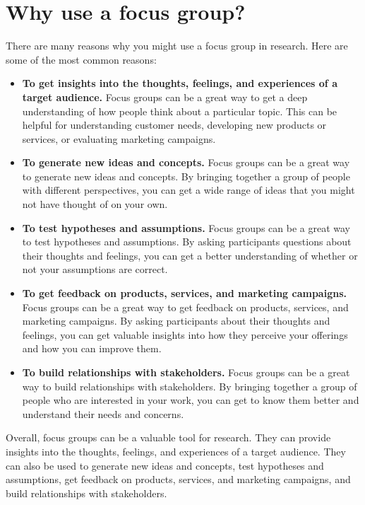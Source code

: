 \documentclass[
  b5paper]{book}
\begin{document}
\hypertarget{why-use-a-focus-group}{%
\section*{Why use a focus group?}\label{why-use-a-focus-group}}

There are many reasons why you might use a focus group in research. Here are some of the most common reasons:

\begin{itemize}
\item
  \textbf{To get insights into the thoughts, feelings, and experiences of a target audience.} Focus groups can be a great way to get a deep understanding of how people think about a particular topic. This can be helpful for understanding customer needs, developing new products or services, or evaluating marketing campaigns.
\item
  \textbf{To generate new ideas and concepts.} Focus groups can be a great way to generate new ideas and concepts. By bringing together a group of people with different perspectives, you can get a wide range of ideas that you might not have thought of on your own.
\item
  \textbf{To test hypotheses and assumptions.} Focus groups can be a great way to test hypotheses and assumptions. By asking participants questions about their thoughts and feelings, you can get a better understanding of whether or not your assumptions are correct.
\item
  \textbf{To get feedback on products, services, and marketing campaigns.} Focus groups can be a great way to get feedback on products, services, and marketing campaigns. By asking participants about their thoughts and feelings, you can get valuable insights into how they perceive your offerings and how you can improve them.
\item
  \textbf{To build relationships with stakeholders.} Focus groups can be a great way to build relationships with stakeholders. By bringing together a group of people who are interested in your work, you can get to know them better and understand their needs and concerns.
\end{itemize}

Overall, focus groups can be a valuable tool for research. They can provide insights into the thoughts, feelings, and experiences of a target audience. They can also be used to generate new ideas and concepts, test hypotheses and assumptions, get feedback on products, services, and marketing campaigns, and build relationships with stakeholders.
\end{document}
